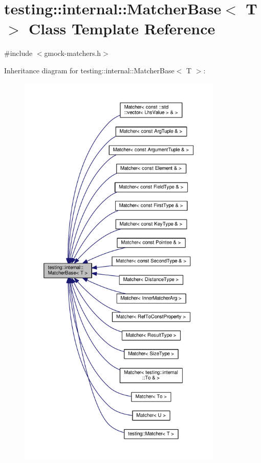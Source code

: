 \hypertarget{classtesting_1_1internal_1_1MatcherBase}{}\section{testing\+:\+:internal\+:\+:Matcher\+Base$<$ T $>$ Class Template Reference}
\label{classtesting_1_1internal_1_1MatcherBase}


{\ttfamily \#include $<$gmock-\/matchers.\+h$>$}



Inheritance diagram for testing\+:\+:internal\+:\+:Matcher\+Base$<$ T $>$\+:\nopagebreak
\begin{figure}[H]
\begin{center}
\leavevmode
\includegraphics[height=550pt]{classtesting_1_1internal_1_1MatcherBase__inherit__graph}
\end{center}
\end{figure}
